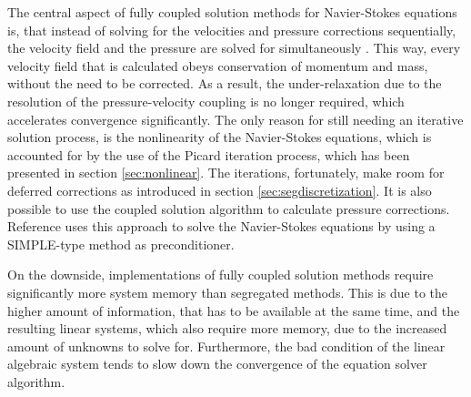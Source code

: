 The central aspect of fully coupled solution methods for Navier-Stokes equations is, that instead of solving for the velocities and pressure corrections sequentially, the velocity field and the pressure are solved for simultaneously \cite{schaefer99}. This way, every velocity field that is calculated obeys conservation of momentum and mass, without the need to be corrected. As a result, the under-relaxation due to the resolution of the pressure-velocity coupling is no longer required, which accelerates convergence significantly. The only reason for still needing an iterative solution process, is the nonlinearity of the Navier-Stokes equations, which is accounted for by the use of the Picard iteration process, which has been presented in section \ref{sec:nonlinear}. The iterations, fortunately, make room for deferred corrections as introduced in section \ref{sec:segdiscretization}. It is also possible to use the coupled solution algorithm to calculate pressure corrections. Reference \cite{klaij13} uses this approach to solve the Navier-Stokes equations by using a SIMPLE-type method as preconditioner.

On the downside, implementations of fully coupled solution methods require significantly more system memory than segregated methods. This is due to the higher amount of information, that has to be available at the same time, and the resulting linear systems, which also require more memory, due to the increased amount of unknowns to solve for. Furthermore, the bad condition of the linear algebraic system \cite{schaefer99} tends to slow down the convergence of the equation solver algorithm.

